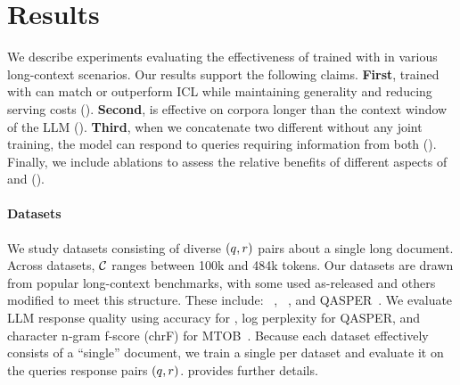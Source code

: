 
\vspace{-2mm}
\section{Results}
\label{sec:results}
\ifx\conference\neuripsconf

\fi
\ifx\conference\arxivconf

\fi
We describe experiments evaluating the effectiveness of \artifacts trained with \method in various long-context scenarios.
Our results support the following claims.
\textbf{First}, \artifacts trained with \method can match or outperform ICL while maintaining generality and reducing serving costs ().
\textbf{Second}, \method is effective on corpora longer than the context window of the LLM ().
\textbf{Third}, when we concatenate two different \artifacts without any joint training, the model can respond to queries requiring information from both \artifacts ().
Finally, we include ablations to assess the relative benefits of different aspects of \method and \artifacts ().
\vspace{-2mm}
\paragraph{Datasets} We study datasets consisting of diverse $(q, r)$ pairs about a single long document. Across datasets, $\mathcal{C}$ ranges between 100k and 484k tokens. Our datasets are drawn from popular long-context benchmarks, with some used as-released and others modified to meet this structure. These include: \longhealth~\cite{adams2024longhealth}, \mtob~\cite{tanzer2023benchmark}, and QASPER~\cite{dasigi2021dataset}. We evaluate LLM response quality using accuracy for \longhealth, log perplexity for QASPER, and character n-gram f-score (chrF) for MTOB~\cite{tanzer2023benchmark, popovic2015chrf}. Because each dataset effectively consists of a ``single'' document, we train a single \artifact per dataset and evaluate it on the queries response pairs $(q, r)$.  provides further details.
\ifx\conference\icmlconf

\fi
\vspace{-2mm}
